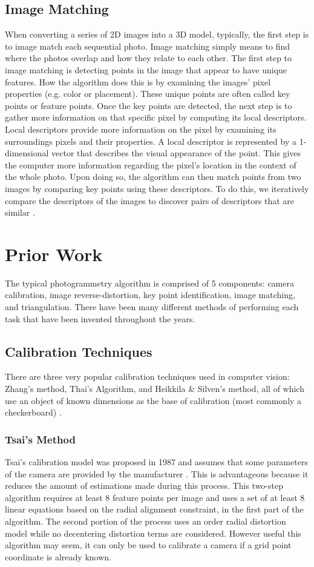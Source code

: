 \documentclass[10pt,twocolumn]{article}
\begin{document}
\subsection{Image Matching}
When converting a series of 2D images into a 3D model, typically, the first step is to image match each sequential photo. Image matching simply means to find where the photos overlap and how they relate to each other. The first step to image matching is detecting points in the image that appear to have unique features. How the algorithm does this is by examining the images' pixel properties (e.g. color or placement). These unique points are often called key points or feature points. Once the key points are detected, the next step is to gather more information on that specific pixel by computing its local descriptors. Local descriptors provide more information on the pixel by examining its surroundings pixels and their properties. A local descriptor is represented by a 1-dimensional vector that describes the visual appearance of the point. This gives the computer more information regarding the pixel's location in the context of the whole photo. Upon doing so, the algorithm can then match points from two images by comparing key points using these descriptors. To do this, we iteratively compare the descriptors of the images to discover pairs of descriptors that are similar \cite{jayanthi2016comparison}. 



\section{Prior Work}
The typical photogrammetry algorithm is comprised of 5 components: camera calibration, image reverse-distortion, key point identification, image matching, and triangulation. There have been many different methods of performing each task that have been invented throughout the years. 

\subsection{Calibration Techniques}
There are three very popular calibration techniques used in computer vision: Zhang's method, Thai's Algorithm, and Heikkila & Silven's method, all of which use an object of known dimensions as the base of calibration (most commonly a checkerboard) \cite{remondino2006digital}. 
\subsubsection{Tsai's Method}
Tsai’s calibration model was proposed in 1987 and assumes that some parameters of the
camera are provided by the manufacturer \cite{remondino2006digital}. This is advantageous because it reduces the amount of estimations made during this process. This two-step algorithm requires at least 8 feature points per image and uses a set of at least 8 linear equations based on the radial alignment constraint, in the first part of the algorithm. The second portion of the process uses an order radial distortion model while no decentering distortion terms are considered. However useful this algorithm may seem, it can only be used to calibrate a camera if a grid point coordinate is already known.
\end{document}
